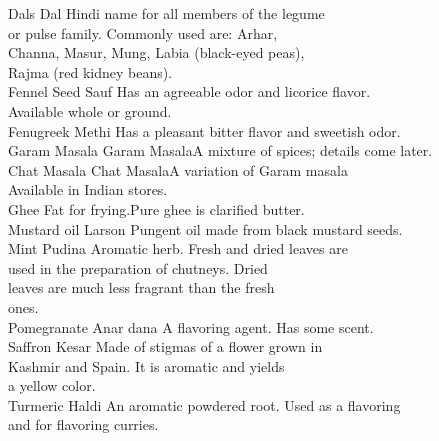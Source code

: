 \begin{tabbing}
\> Dals          \> Dal  \> Hindi name for all members of the legume\\
\>               \>      \> or pulse family.  Commonly used are: Arhar, \\
\>               \>      \> Channa, Masur, Mung, Labia (black-eyed peas),\\
\>               \>      \> Rajma (red kidney beans).\\

\> Fennel Seed   \> Sauf\> Has an agreeable odor and licorice flavor.\\
\>               \>      \> Available whole or ground.\\

\> Fenugreek     \> Methi\> Has a pleasant bitter flavor and sweetish odor.\\

\> Garam Masala  \>Garam Masala\>A mixture of spices; details come later.\\
\> Chat Masala  \>Chat Masala\>A variation of Garam masala\\
\>  		\>	     \>Available in Indian stores.\\

\> Ghee           \> Fat for frying.\>Pure ghee is clarified butter.\\

\> Mustard oil    \> Larson \> Pungent oil made from black mustard seeds.\\

\> Mint            \> Pudina\> Aromatic herb.  Fresh and dried leaves are\\
\>                 \>      \> used in the preparation of chutneys.  Dried\\
\>                 \>      \> leaves are much less fragrant than the fresh\\
\>                 \>      \> ones.\\

\> Pomegranate      \> Anar dana\> A flavoring agent.  Has some scent.\\

\> Saffron          \> Kesar\> Made of stigmas of a flower grown in\\
\>                  \>      \> Kashmir and Spain.  It is aromatic and yields\\
\>                  \>      \> a yellow color.\\

\> Turmeric          \> Haldi\> An aromatic powdered root.  Used as a flavoring\\
\>                   \>      \>and for flavoring curries.\\
\end{tabbing}

